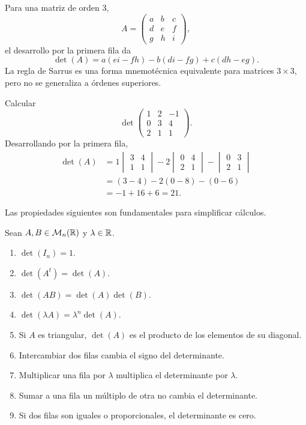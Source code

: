 Para una matriz de orden $3$,
\[
A=
\begin{pmatrix}
a&b&c\\
d&e&f\\
g&h&i
\end{pmatrix},
\]
el desarrollo por la primera fila da
\[
\det(A)
=a(ei-fh)-b(di-fg)+c(dh-eg).
\]
La regla de Sarrus es una forma mnemotécnica equivalente para matrices $3\times3$, pero no se generaliza a órdenes superiores.

\begin{example}
Calcular
\[
\det\begin{pmatrix}
1&2&-1\\
0&3&4\\
2&1&1
\end{pmatrix}.
\]
Desarrollando por la primera fila,
\begin{align*}
\det(A)
&=1\begin{vmatrix}3&4\\1&1\end{vmatrix}
-2\begin{vmatrix}0&4\\2&1\end{vmatrix}
-\begin{vmatrix}0&3\\2&1\end{vmatrix}\\
&=(3-4)-2(0-8)-(0-6)\\
&=-1+16+6=21.
\end{align*}
\end{example}

Las propiedades siguientes son fundamentales para simplificar cálculos.

\begin{theorem}
Sean $A,B\in\mathcal M_n(\mathbb{R})$ y $\lambda\in\mathbb{R}$.
\begin{enumerate}[label=\alph*)]
\item $\det(I_n)=1$.
\item $\det(A^t)=\det(A)$.
\item $\det(AB)=\det(A)\det(B)$.
\item $\det(\lambda A)=\lambda^n\det(A)$.
\item Si $A$ es triangular, $\det(A)$ es el producto de los elementos de su diagonal.
\item Intercambiar dos filas cambia el signo del determinante.
\item Multiplicar una fila por $\lambda$ multiplica el determinante por $\lambda$.
\item Sumar a una fila un múltiplo de otra no cambia el determinante.
\item Si dos filas son iguales o proporcionales, el determinante es cero.
\end{enumerate}
\end{theorem}


